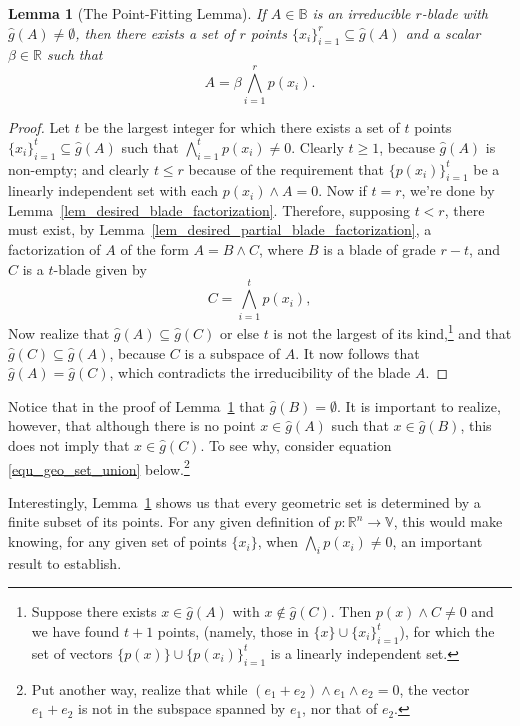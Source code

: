 \documentclass{birkjour}
\newtheorem{lem}[thm]{Lemma}
\theoremstyle{definition}
\theoremstyle{remark}
\numberwithin{equation}{section}
\newcommand{\R}{\mathbb{R}}
\newcommand{\B}{\mathbb{B}}
\newcommand{\V}{\mathbb{V}}
\newcommand{\gh}{\hat{g}}
\begin{document}
\begin{lem}[The Point-Fitting Lemma]\label{lem_factorization_of_irreducible_blades}
If $A\in\B$ is an irreducible $r$-blade with $\gh(A)\neq\emptyset$, then there exists a set of $r$ points $\{x_i\}_{i=1}^r\subseteq\gh(A)$
and a scalar $\beta\in\R$ such that
\begin{equation}
A=\beta\bigwedge_{i=1}^r p(x_i).
\end{equation}
\end{lem}
\begin{proof}
Let $t$ be the largest integer for which there exists a set of $t$ points $\{x_i\}_{i=1}^t\subseteq\gh(A)$ such that
$\bigwedge_{i=1}^t p(x_i)\neq 0$.
Clearly $t\geq 1$, because $\gh(A)$ is non-empty; and clearly $t\leq r$ because of
the requirement that $\{p(x_i)\}_{i=1}^t$ be a linearly independent set with each $p(x_i)\wedge A=0$.  Now if $t=r$, we're
done by Lemma~\ref{lem_desired_blade_factorization}.  Therefore,
supposing $t<r$, there must exist, by Lemma~\ref{lem_desired_partial_blade_factorization}, a factorization of $A$ of the form
$A=B\wedge C$, where $B$ is a blade of grade $r-t$, and $C$ is a $t$-blade given by
\begin{equation}
C=\bigwedge_{i=1}^t p(x_i),
\end{equation}
Now realize that $\gh(A)\subseteq\gh(C)$ or else $t$ is not the largest of its kind,\footnote{Suppose
there exists $x\in\gh(A)$ with $x\not\in\gh(C)$.  Then $p(x)\wedge C\neq 0$ and we have found $t+1$
points, (namely, those in $\{x\}\cup\{x_i\}_{i=1}^t$), for which the set of vectors $\{p(x)\}\cup\{p(x_i)\}_{i=1}^t$ is a linearly independent set.} and
that $\gh(C)\subseteq\gh(A)$, because $C$ is a subspace of $A$.
It now follows that $\gh(A)=\gh(C)$, which contradicts the irreducibility of the blade $A$.
\end{proof}

Notice that in the proof of Lemma~\ref{lem_factorization_of_irreducible_blades} that $\gh(B)=\emptyset$.  It is important to realize, however,
that although there is no point $x\in\gh(A)$ such that $x\in\gh(B)$, this does not imply that $x\in\gh(C)$.
To see why, consider equation \eqref{equ_geo_set_union} below.\footnote{Put another way,
realize that while $(e_1+e_2)\wedge e_1\wedge e_2=0$, the vector $e_1+e_2$ is not in the subspace
spanned by $e_1$, nor that of $e_2$.}

Interestingly, Lemma~\ref{lem_factorization_of_irreducible_blades} shows us that every geometric
set is determined by a finite subset of its points.  For any given definition of $p:\R^n\to\V$, this
would make knowing, for any given set of points $\{x_i\}$, when $\bigwedge_i p(x_i)\neq 0$,
an important result to establish.
\end{document}
